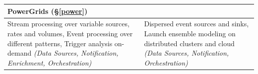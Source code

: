 \begin{table}[h]
\begin{scriptsize}
\begin{center}
\begin{tabular}{|p{6.7cm}|p{6.7cm}|}








\\
		\hline
\multicolumn{2}{|l|}{{\textbf{PowerGrids} (\S\ref{power})}} \\ \hline	
	
Stream processing over variable sources, rates and volumes, Event processing over different
patterns, Trigger analysis on-demand  \emph{(Data
  Sources, Notification, Enrichment,  Orchestration)} %
&
Dispersed event sources and sinks, Launch ensemble modeling on distributed clusters and cloud
\emph{(Data Sources, Notification,  Orchestration)} %


\end{tabular}
\end{center}
\end{scriptsize}
\end{table}
